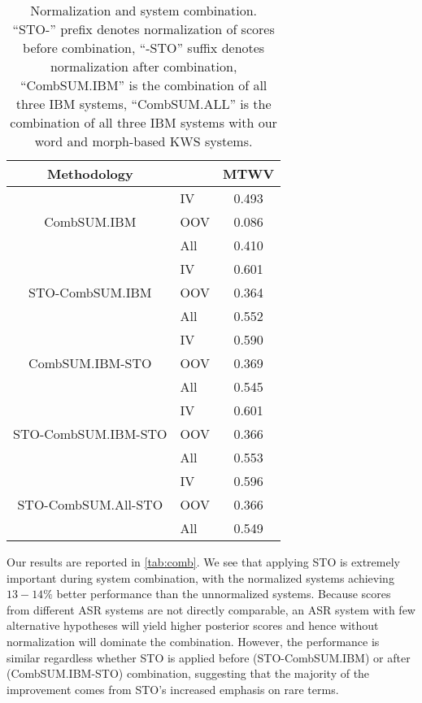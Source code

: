 \documentclass[a4paper,oneside,reqno]{amsart}
\begin{document}
\begin{table}[ht!]
  \begin{tabular}{clc}
    \toprule
    Methodology & & MTWV \\
    \midrule
    \multirow{3}{*}{CombSUM.IBM}         & IV  & 0.493 \\
                                         & OOV & 0.086 \\
                                         & All & 0.410 \\
    \hline
    \multirow{3}{*}{STO-CombSUM.IBM}     & IV  & 0.601 \\
                                         & OOV & 0.364 \\
                                         & All & 0.552 \\
    \hline
    \multirow{3}{*}{CombSUM.IBM-STO}     & IV  & 0.590 \\
                                         & OOV & 0.369 \\
                                         & All & 0.545 \\
    \hline
    \multirow{3}{*}{STO-CombSUM.IBM-STO} & IV  & 0.601 \\
                                         & OOV & 0.366 \\
                                         & All & 0.553 \\

    \hline
    \multirow{3}{*}{STO-CombSUM.All-STO} & IV  & 0.596 \\
                                         & OOV & 0.366 \\
                                         & All & 0.549 \\
    \bottomrule
  \end{tabular}
  \caption{Normalization and system combination. ``STO-'' prefix denotes
  normalization of scores before combination, ``-STO'' suffix denotes normalization
  after combination, ``CombSUM.IBM'' is the combination of all three IBM systems,
  ``CombSUM.ALL'' is the combination of all three IBM systems with our word and
  morph-based KWS systems.}
  \label{tab:comb}
\end{table}

Our results are reported in \autoref{tab:comb}. We see that applying STO is
extremely important during system combination, with the normalized systems
achieving $13-14\%$ better performance than the unnormalized systems. Because
scores from different ASR systems are not directly comparable, an ASR system
with few alternative hypotheses will yield higher posterior scores and hence
without normalization will dominate the combination. However, the performance
is similar regardless whether STO is applied before (STO-CombSUM.IBM) or after
(CombSUM.IBM-STO) combination, suggesting that the majority of the improvement
comes from STO's increased emphasis on rare terms.
\end{document}
